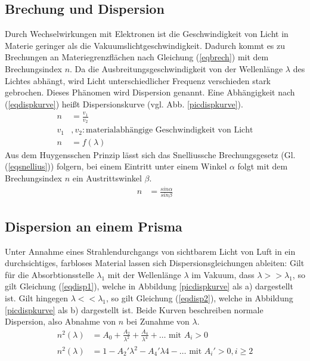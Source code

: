 \subsection{Brechung und Dispersion}

Durch Wechselwirkungen mit Elektronen ist die Geschwindigkeit von Licht in Materie
geringer als die Vakuumslichtgeschwindigkeit. Dadurch kommt es zu Brechungen an 
Materiegrenzflächen nach Gleichung (\ref{eqbrech}) mit dem Brechungsindex $n$.
Da die Ausbreitungsgeschwindigkeit von der Wellenlänge $\lambda$ des Lichtes abhängt, 
wird Licht unterschiedlicher Frequenz verschieden stark gebrochen. Dieses
Phänomen wird Dispersion genannt. Eine Abhängigkeit nach (\ref{eqdispkurve})
heißt Dispersionskurve\cite{anleitung} (vgl. Abb. \ref{picdispkurve}).
\begin{align}
n&=\frac{v_1}{v_2} \label{eqbrech} \\
v_1&, v_2 : \text{materialabhängige Geschwindigkeit von Licht} \nonumber \\
n&=f(\lambda) \label{eqdispkurve}
\end{align}
Aus dem Huygensschen Prinzip lässt sich das Snelliussche Brechungsgesetz (Gl. (\ref{eqsnellius})) folgern,
bei einem Eintritt unter einem Winkel $\alpha$ folgt mit dem Brechungsindex $n$ ein
Austrittswinkel $\beta$.
\begin{align}
n&=\frac{sin \alpha}{sin \beta}\label{eqsnellius}
\end{align}
\subsection{Dispersion an einem Prisma}
Unter Annahme eines Strahlendurchgangs von sichtbarem Licht von Luft in
ein durchsichtiges, farbloses Material lassen sich Dispersionsgleichungen \cite{anleitung} ableiten:
Gilt für die Absorbtionsstelle $\lambda_1$ mit der Wellenlänge $\lambda$ im Vakuum, dass $\lambda>>\lambda_1$,
so gilt Gleichung (\ref{eqdisp1}), welche in Abbildung \ref{picdispkurve} als a) dargestellt ist.
Gilt hingegen $\lambda<<\lambda_1$, so gilt Gleichung (\ref{eqdisp2}), welche in Abbildung \ref{picdispkurve} 
als b) dargestellt ist. Beide Kurven beschreiben normale Dispersion, also Abnahme von $n$ bei Zunahme von $\lambda$.
\begin{align}
n^2(\lambda)&=A_0+\frac{A_2}{\lambda^2}+\frac{A_4}{\lambda^4}+\ldots \text{ mit } A_i>0 \label{eqdisp1} \\
n^2(\lambda)&=1-A_2' \lambda^2-A_4'\lambda4-\ldots \text{ mit } A_i'>0, i\geq 2 \label{eqdisp2}
\end{align}
